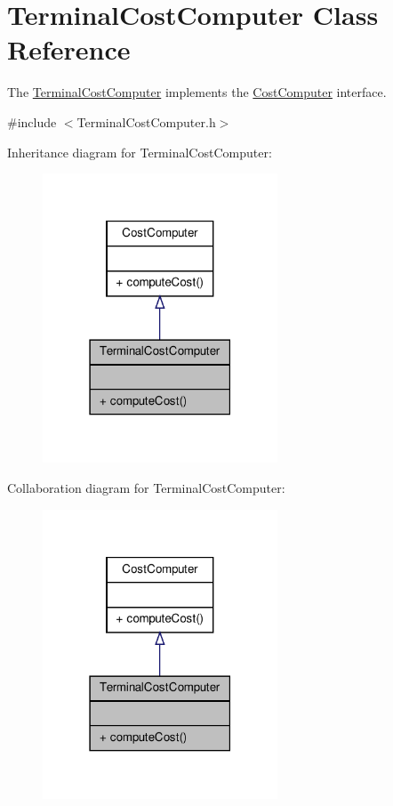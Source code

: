 \hypertarget{classTerminalCostComputer}{\section{\-Terminal\-Cost\-Computer \-Class \-Reference}
\label{classTerminalCostComputer}
}


\-The \hyperlink{classTerminalCostComputer}{\-Terminal\-Cost\-Computer} implements the \hyperlink{classCostComputer}{\-Cost\-Computer} interface.  




{\ttfamily \#include $<$\-Terminal\-Cost\-Computer.\-h$>$}



\-Inheritance diagram for \-Terminal\-Cost\-Computer\-:\nopagebreak
\begin{figure}[H]
\begin{center}
\leavevmode
\includegraphics[width=198pt]{classTerminalCostComputer__inherit__graph}
\end{center}
\end{figure}


\-Collaboration diagram for \-Terminal\-Cost\-Computer\-:\nopagebreak
\begin{figure}[H]
\begin{center}
\leavevmode
\includegraphics[width=198pt]{classTerminalCostComputer__coll__graph}
\end{center}
\end{figure}
